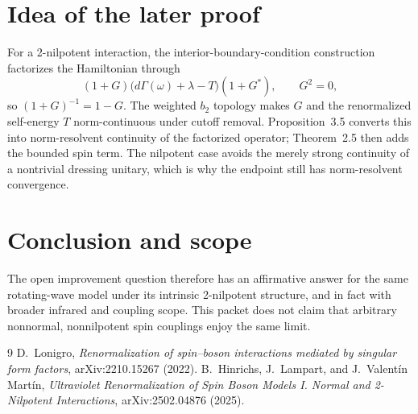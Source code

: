 \documentclass[10pt]{article}
\begin{document}
\section*{Idea of the later proof}

For a 2-nilpotent interaction, the interior-boundary-condition construction
factorizes the Hamiltonian through
\[
 (1+G)\bigl(d\Gamma(\omega)+\lambda-T\bigr)(1+G^*),
 \qquad G^2=0,
\]
so $(1+G)^{-1}=1-G$.  The weighted $b_2$ topology makes $G$ and the
renormalized self-energy $T$ norm-continuous under cutoff removal.
Proposition~3.5 converts this into norm-resolvent continuity of the
factorized operator; Theorem~2.5 then adds the bounded spin term.  The
nilpotent case avoids the merely strong continuity of a nontrivial dressing
unitary, which is why the endpoint still has norm-resolvent convergence.

\section*{Conclusion and scope}

The open improvement question therefore has an affirmative answer for the
same rotating-wave model under its intrinsic 2-nilpotent structure, and in
fact with broader infrared and coupling scope.  This packet does not claim
that arbitrary nonnormal, nonnilpotent spin couplings enjoy the same limit.

\scriptsize
\begin{thebibliography}{9}
 D.~Lonigro, \emph{Renormalization of spin--boson interactions
mediated by singular form factors}, arXiv:2210.15267 (2022).
 B.~Hinrichs, J.~Lampart, and J.~Valent\'in Mart\'in,
\emph{Ultraviolet Renormalization of Spin Boson Models I. Normal and
2-Nilpotent Interactions}, arXiv:2502.04876 (2025).
\end{thebibliography}
\end{document}
